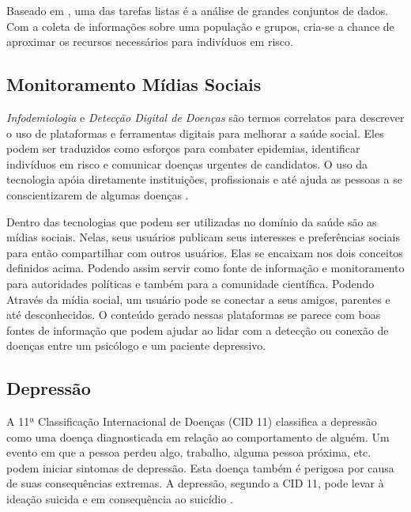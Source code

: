 \documentclass[11pt, notitlepage]{article} %
\begin{document}
Baseado em \cite{info:doi/10.2196/19866}, uma das tarefas listas é a análise de grandes conjuntos de dados. Com a coleta de informações sobre uma população e grupos, cria-se a chance de aproximar os recursos necessários para indivíduos em risco. 

\subsection*{Monitoramento Mídias Sociais}
\textit{Infodemiologia} e \textit{Detecção Digital de Doenças} são termos correlatos para descrever o uso de plataformas e ferramentas digitais para melhorar a saúde social. Eles podem ser traduzidos como esforços para combater epidemias, identificar indivíduos em risco e comunicar doenças urgentes de candidatos. O uso da tecnologia apóia diretamente instituições, profissionais e até ajuda as pessoas a se conscientizarem de algumas doenças \cite{Horvitz}.

Dentro das tecnologias que podem ser utilizadas no domínio da saúde são as mídias sociais. Nelas, seus usuários publicam seus interesses e preferências sociais para então compartilhar com outros usuários. Elas se encaixam nos dois conceitos definidos acima. Podendo assim servir como fonte de informação e monitoramento para autoridades políticas e também para a comunidade científica. Podendo 
Através da mídia social, um usuário pode se conectar a seus amigos, parentes e até desconhecidos.
O conteúdo gerado nessas plataformas se parece com boas fontes de informação que podem ajudar ao lidar com a detecção ou conexão de doenças entre um psicólogo e um paciente depressivo.

\subsection*{Depressão}

A 11ª Classificação Internacional de Doenças (CID 11) classifica a depressão como uma doença diagnosticada em relação ao comportamento de alguém. Um evento em que a pessoa perdeu algo, trabalho, alguma pessoa próxima, etc. podem iniciar sintomas de depressão. Esta doença também é perigosa por causa de suas consequências extremas. A depressão, segundo a CID 11, pode levar à ideação suicida e em consequência ao suicídio \cite{american2013diagnostic}.
\end{document}

